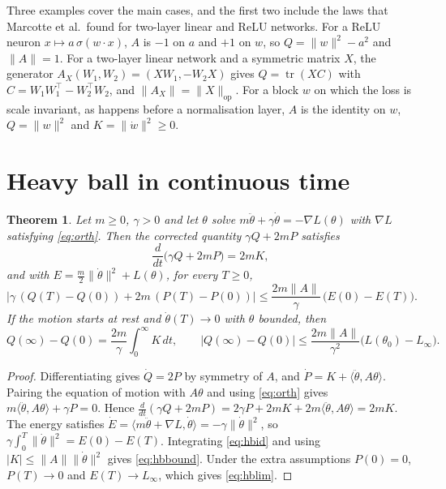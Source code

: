 \documentclass[11pt]{article}
\newtheorem{theorem}{Theorem}
\theoremstyle{remark}
\theoremstyle{definition}
\newcommand{\ip}[2]{\langle #1,#2\rangle}
\begin{document}
Three examples cover the main cases, and the first two include the laws that Marcotte et al.\ found for two-layer linear and ReLU networks. For a ReLU neuron $x\mapsto a\,\sigma(w\cdot x)$, $A$ is $-1$ on $a$ and $+1$ on $w$, so $Q=\|w\|^2-a^2$ and $\|A\|=1$. For a two-layer linear network and a symmetric matrix $X$, the generator $A_X(W_1,W_2)=(XW_1,-W_2X)$ gives $Q=\operatorname{tr}(XC)$ with $C=W_1W_1^\top-W_2^\top W_2$, and $\|A_X\|=\|X\|_{\mathrm{op}}$. For a block $w$ on which the loss is scale invariant, as happens before a normalisation layer, $A$ is the identity on $w$, $Q=\|w\|^2$ and $K=\|\dot w\|^2\ge0$.

\section{Heavy ball in continuous time}\label{sec:hb}

\begin{theorem}\label{thm:hb}
Let $m\ge0$, $\gamma>0$ and let $\theta$ solve $m\ddot\theta+\gamma\dot\theta=-\nabla L(\theta)$ with $\nabla L$ satisfying \eqref{eq:orth}. Then the corrected quantity $\gamma Q+2mP$ satisfies
\begin{equation}\label{eq:hbid}
\frac{d}{dt}\bigl(\gamma Q+2mP\bigr)=2mK ,
\end{equation}
and with $E=\tfrac m2\|\dot\theta\|^2+L(\theta)$, for every $T\ge0$,
\begin{equation}\label{eq:hbbound}
\bigl|\gamma\,(Q(T)-Q(0))+2m\,(P(T)-P(0))\bigr|\le\frac{2m\|A\|}{\gamma}\,\bigl(E(0)-E(T)\bigr).
\end{equation}
If the motion starts at rest and $\dot\theta(T)\to0$ with $\theta$ bounded, then
\begin{equation}\label{eq:hblim}
Q(\infty)-Q(0)=\frac{2m}{\gamma}\int_0^\infty K\,dt,\qquad |Q(\infty)-Q(0)|\le\frac{2m\|A\|}{\gamma^2}\bigl(L(\theta_0)-L_\infty\bigr).
\end{equation}
\end{theorem}

\begin{proof}
Differentiating gives $\dot Q=2P$ by symmetry of $A$, and $\dot P=K+\ip{\ddot\theta}{A\theta}$. Pairing the equation of motion with $A\theta$ and using \eqref{eq:orth} gives $m\ip{\ddot\theta}{A\theta}+\gamma P=0$. Hence $\frac{d}{dt}(\gamma Q+2mP)=2\gamma P+2mK+2m\ip{\ddot\theta}{A\theta}=2mK$. The energy satisfies $\dot E=\ip{m\ddot\theta+\nabla L}{\dot\theta}=-\gamma\|\dot\theta\|^2$, so $\gamma\int_0^T\|\dot\theta\|^2=E(0)-E(T)$. Integrating \eqref{eq:hbid} and using $|K|\le\|A\|\|\dot\theta\|^2$ gives \eqref{eq:hbbound}. Under the extra assumptions $P(0)=0$, $P(T)\to0$ and $E(T)\to L_\infty$, which gives \eqref{eq:hblim}.
\end{proof}
\end{document}

